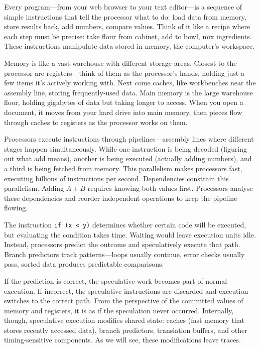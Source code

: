 Every program—from your web browser to your text editor—is a sequence of simple instructions that tell the processor what to do: load data from memory, store results back, add numbers, compare values. Think of it like a recipe where each step must be precise: \QSOpen{}take flour from cabinet,\QSClose{} \QSOpen{}add to bowl,\QSClose{} \QSOpen{}mix ingredients.\QSClose{} These instructions manipulate data stored in memory, the computer's workspace.

Memory is like a vast warehouse with different storage areas. Closest to the processor are registers—think of them as the processor's hands, holding just a few items it's actively working with. Next come caches, like workbenches near the assembly line, storing frequently-used data. Main memory is the large warehouse floor, holding gigabytes of data but taking longer to access. When you open a document, it moves from your hard drive into main memory, then pieces flow through caches to registers as the processor works on them.

Processors execute instructions through pipelines—assembly lines where different stages happen simultaneously. While one instruction is being decoded (figuring out what \QSOpen{}add\QSClose{} means), another is being executed (actually adding numbers), and a third is being fetched from memory. This parallelism makes processors fast, executing billions of instructions per second. Dependencies constrain this parallelism. Adding $A+B$ requires knowing both values first. Processors analyse these dependencies and reorder independent operations to keep the pipeline flowing. 

The instruction \texttt{if (x < y)} determines whether certain code will be executed, but evaluating the condition takes time. Waiting would leave execution units idle. Instead, processors predict the outcome and speculatively execute that path. Branch predictors track patterns—loops usually continue, error checks usually pass, sorted data produces predictable comparisons.

If the prediction is correct, the speculative work becomes part of normal execution. If incorrect, the speculative instructions are discarded and execution switches to the correct path. From the perspective of the committed values of memory and registers, it is as if the speculation never occurred. Internally, though, speculative execution modifies shared state: caches (fast memory that stores recently accessed data), branch predictors, translation buffers, and other timing-sensitive components. As we will see, these modifications leave traces.


